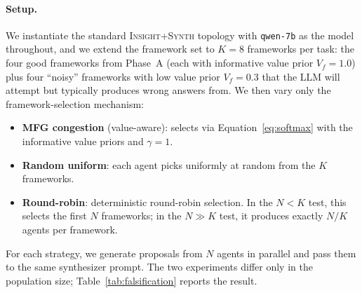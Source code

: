 \documentclass[11pt]{amsart}
\newcommand{\g}{\gamma}
\newcommand\1{{\mathds{1}}}
\theoremstyle{definition}
\theoremstyle{remark}
\numberwithin{equation}{section}
\begin{document}
\paragraph{Setup.}
We instantiate the standard \textsc{Insight+Synth} topology with \texttt{qwen-7b} as the model throughout, and we extend the framework set to $K\!=\!8$ frameworks per task: the four good frameworks from Phase~A (each with informative value prior $V_f = 1.0$) plus four ``noisy'' frameworks with low value prior $V_f = 0.3$ that the LLM will attempt but typically produces wrong answers from.
We then vary only the framework-selection mechanism:
\begin{itemize}[leftmargin=1.4em, itemsep=2pt]
\item \textbf{MFG congestion} (value-aware): selects via Equation~\eqref{eq:softmax} with the informative value priors and $\g\!=\!1$.
\item \textbf{Random uniform}: each agent picks uniformly at random from the $K$ frameworks.
\item \textbf{Round-robin}: deterministic round-robin selection. In the $N\!<\!K$ test, this selects the first $N$ frameworks; in the $N\!\gg\!K$ test, it produces exactly $N/K$ agents per framework.
\end{itemize}
For each strategy, we generate proposals from $N$ agents in parallel and pass them to the same synthesizer prompt.
The two experiments differ only in the population size; Table~\ref{tab:falsification} reports the result.
\end{document}

